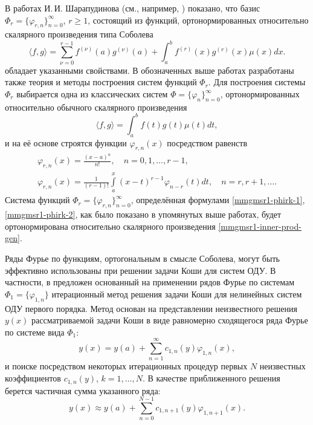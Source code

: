В работах И.\,И. Шарапудинова (см., например, \cite{RamShaIzv, mmgmsr1-Shii-Shti-izvvuzov2017, mmgmsr1-Shii-matzam2017, mmgmsr1-ShaGadGad16, mmgmsr1-ShaGad16, mmgmsr1-Shii-lag-demi2015, mmgmsr1-SHII-MMG-Demi2015}) показано, что базис $\Phi_r=\{\varphi_{r,n}\}_{n=0}^\infty$, $r \ge 1$, состоящий из функций, ортонормированных относительно скалярного произведения типа Соболева
\begin{equation}\label{mmgmsr1-inner-prod-gen}
\langle f,g \rangle =
\sum_{\nu=0}^{r-1}f^{(\nu)}(a)g^{(\nu)}(a)+\int_{a}^{b}f^{(r)}(x)g^{(r)}(x)\mu(x)dx.
\end{equation}
обладает указанными свойствами.
В обозначенных выше работах разработаны также теория и методы построения систем функций $\Phi_r$. Для построения системы $\Phi_r$ выбирается одна из классических систем $\Phi =\{\varphi_n\}_{n=0}^\infty$, ортонормированных относительно обычного скалярного произведения
\begin{equation}\label{mmgmsr1-classic-mul}
\langle f,g \rangle =\int_{a}^{b}f(t)g(t)\mu(t)dt,
\end{equation}
и на её основе строятся функции $\varphi_{r,n}(x)$ посредством равенств
\begin{gather}
\label{mmgmsr1-phirk-1}
\varphi_{r,n}(x) =\frac{(x-a)^n}{n!}, \quad n=0,1,\ldots, r-1,\\
\label{mmgmsr1-phirk-2}
\varphi_{r,n}(x) =\frac{1}{(r-1)!}\int\limits_{a}^x(x-t)^{r-1}\varphi_{n-r}(t)dt, \quad n=r,r+1,\ldots.
\end{gather}
Система функций $\Phi_r=\{\varphi_{r,n}\}_{n=0}^\infty$, определённая формулами \eqref{mmgmsr1-phirk-1}, \eqref{mmgmsr1-phirk-2}, как было показано в упомянутых выше работах, будет ортонормирована относительно скалярного произведения \eqref{mmgmsr1-inner-prod-gen}.

Ряды Фурье по функциям, ортогональным в смысле Соболева, могут быть эффективно использованы при решении задачи Коши для систем ОДУ. В частности, в \cite{RamSharDemr, RamShaMag, mmgmsr1-SMS-SHTI-Demi2017, mmgmsr1-SHII-MSR-Demi2017} предложен основанный на применении рядов Фурье по системам $\Phi_1=\{\varphi_{1,n}\}$ итерационный метод решения задачи Коши для нелинейных систем ОДУ первого порядка. Метод основан на представлении неизвестного решения $y(x)$ рассматриваемой задачи Коши в виде равномерно сходящегося ряда Фурье по системе вида $\Phi_1$:
\begin{equation*}
y(x) = y(a)+\sum\limits_{n=1}^{\infty}
c_{1,n}(y)\varphi_{1,n}(x),
\end{equation*}
и поиске посредством некоторых итерационных процедур первых $N$ неизвестных коэффициентов $c_{1,n}(y)$, $k=1,\ldots,N$. В качестве приближенного решения берется частичная сумма указанного ряда:
\begin{equation}\label{mmgmsr1-y-part-sum}
y(x) \approx y(a)+\sum\limits_{n=0}^{N-1}
c_{1,n+1}(y)\varphi_{1,n+1}(x).
\end{equation}

